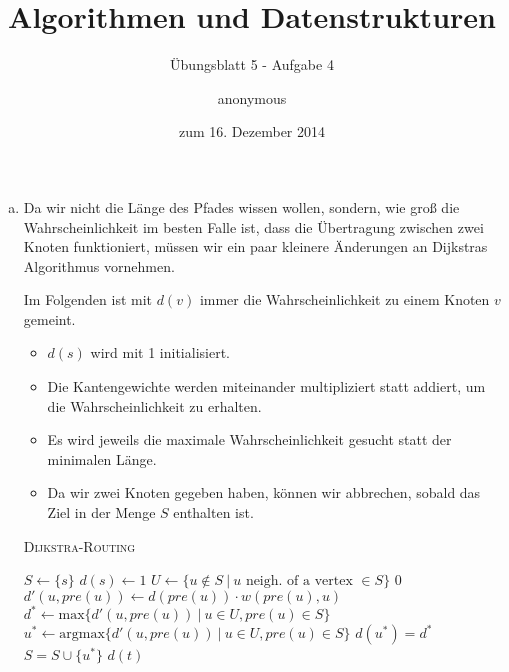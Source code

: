 \documentclass[a4paper]{scrartcl}
\title{Algorithmen und Datenstrukturen}
\subtitle{Übungsblatt 5 - Aufgabe 4}
\author{
    anonymous
}
\date{zum 16. Dezember 2014}
\begin{document}
\maketitle

\begin{enumerate}[(a)]
    \item
        Da wir nicht die Länge des Pfades wissen wollen, sondern, wie groß die
        Wahrscheinlichkeit im besten Falle ist, dass die Übertragung zwischen
        zwei Knoten funktioniert, müssen wir ein paar kleinere Änderungen an
        Dijkstras Algorithmus vornehmen.

        Im Folgenden ist mit $d(v)$ immer die Wahrscheinlichkeit zu einem
        Knoten $v$ gemeint.
        \begin{itemize}
            \item $d(s)$ wird mit 1 initialisiert.
            \item Die Kantengewichte werden miteinander multipliziert statt
                addiert, um die Wahrscheinlichkeit zu erhalten.
            \item Es wird jeweils die maximale Wahrscheinlichkeit gesucht statt
                der minimalen Länge.
            \item Da wir zwei Knoten gegeben haben, können wir abbrechen,
                sobald das Ziel in der Menge $S$ enthalten ist.
        \end{itemize}

        \begin{algorithm}
            \caption{\textsc{Dijkstra-Routing}}
            \label{alg:dag-bf}
            \begin{algorithmic}[1]
                    \State $S \gets \{ s \}$
                    \State $d(s) \gets 1$
                        \State $U \gets \{ u \notin S \ |\  u
                            \text{ neigh. of a vertex } \in S \}$
                            \State \Return $0$
                        \EndIf
                                \State $d'(u, pre(u)) \gets d(pre(u)) \cdot w(pre(u), u)$
                            \EndFor
                        \EndFor
                        \State $d^* \gets \textrm{max} \{ d'(u, pre(u)) \ |\  u \in U, pre(u) \in S \}$
                        \State $u^* \gets \textrm{argmax} \{ d'(u, pre(u)) \ |\  u \in U, pre(u) \in S \}$
                        \State $d(u^*) = d^*$
                        \State $S = S \cup \{ u^* \}$
                    \EndWhile
                    \State \Return $d(t)$
                \EndProcedure
            \end{algorithmic}
        \end{algorithm}


\end{enumerate}
\end{document}
